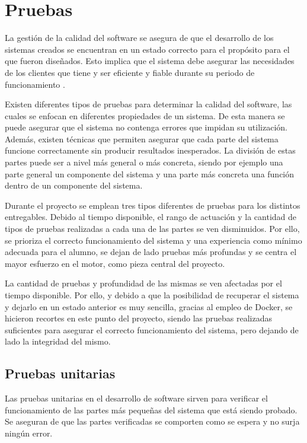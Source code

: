 \chapter{Pruebas}\label{Cap6}

La gestión de la calidad del software se asegura de que el desarrollo de los sistemas creados se encuentran en un estado correcto para el propósito para el que fueron diseñados. Esto implica que el sistema debe asegurar las necesidades de los clientes que tiene y ser eficiente y fiable durante su periodo de funcionamiento \cite{sommerville2016software}.

Existen diferentes tipos de pruebas para determinar la calidad del software, las cuales se enfocan en diferentes propiedades de un sistema. De esta manera se puede asegurar que el sistema no contenga errores que impidan su utilización. Además, existen técnicas que permiten asegurar que cada parte del sistema funcione correctamente sin producir resultados inesperados. La división de estas partes puede ser a nivel más general o más concreta, siendo por ejemplo una parte general un componente del sistema y una parte más concreta una función dentro de un componente del sistema.

Durante el proyecto se emplean tres tipos diferentes de pruebas para los distintos entregables. Debido al tiempo disponible, el rango de actuación y la cantidad de tipos de pruebas realizadas a cada una de las partes se ven disminuidos. Por ello, se prioriza el correcto funcionamiento del sistema y una experiencia como mínimo adecuada para el alumno, se dejan de lado pruebas más profundas y se centra el mayor esfuerzo en el motor, como pieza central del proyecto.

La cantidad de pruebas y profundidad de las mismas se ven afectadas por el tiempo disponible. Por ello, y debido a que la posibilidad de recuperar el sistema y dejarlo en un estado anterior es muy sencilla, gracias al empleo de Docker, se hicieron recortes en este punto del proyecto, siendo las pruebas realizadas suficientes para asegurar el correcto funcionamiento del sistema, pero dejando de lado la integridad del mismo.

\section{Pruebas unitarias}

Las pruebas unitarias en el desarrollo de software sirven para verificar el funcionamiento de las partes más pequeñas del sistema que está siendo probado. Se aseguran de que las partes verificadas se comporten como se espera y no surja ningún error.


